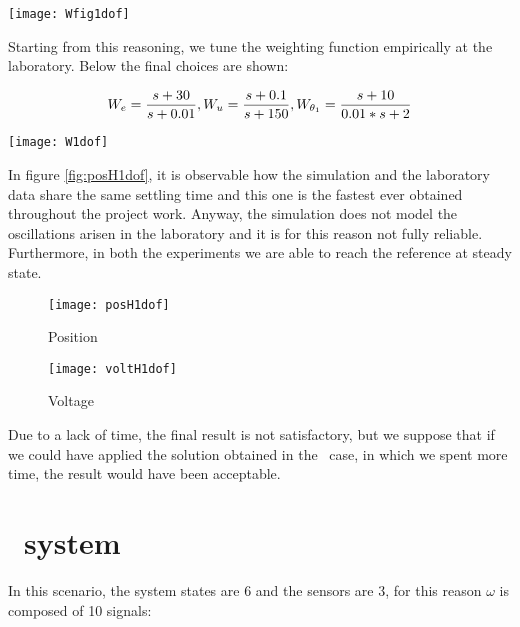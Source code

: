 \begin{figure*}[h]
	\centering
	\texttt{[image: Wfig1dof]}
	\caption{Weighting functions scheme}
	\label{Weighting functions scheme1dof}
\end{figure*}
Starting from this reasoning, we tune the weighting function empirically at the laboratory. Below the final choices are shown:

\begin{equation}
	W_e=
	\frac{s+30}{s+0.01}
	\\
	,
	\\
	W_u=
	\frac{s+0.1}{s+150}
	\\
	,
	\\
	W_{\theta_{1}}=
	\frac{s+10}{0.01*s+2}
\end{equation}

\begin{figure*}[h]
	\centering
	\texttt{[image: W1dof]}
	\caption{Weighting functions}
\end{figure*}

 In figure \ref{fig:posH1dof}, it is observable how the simulation and the laboratory data share the same settling time and this one is the fastest ever obtained throughout the project work. Anyway, the simulation does not model the oscillations arisen in the laboratory and it is for this reason not fully reliable. Furthermore, in both the experiments we are able to reach the reference at steady state.
 
 \begin{figure*}[h]
 	\centering
 	\begin{subfigure}{0.5\columnwidth}
 		\texttt{[image: posH1dof]}
 		\caption{Position}
 	\end{subfigure}
 	\begin{subfigure}{0.45\columnwidth}
 		\texttt{[image: voltH1dof]}
 		\caption{Voltage}
 	\end{subfigure}
 	\caption{Position step response}
 	\label{fig:posH1dof}
 \end{figure*}

Due to a lack of time, the final result is not satisfactory, but we suppose that if we could have applied the solution obtained in the \twodof~case, in which we spent more time, the result would have been acceptable.
\newpage
\section{\twodof\ system}
In this scenario, the system states are 6 and the sensors are 3, for this reason $\omega$ is composed of 10 signals:

